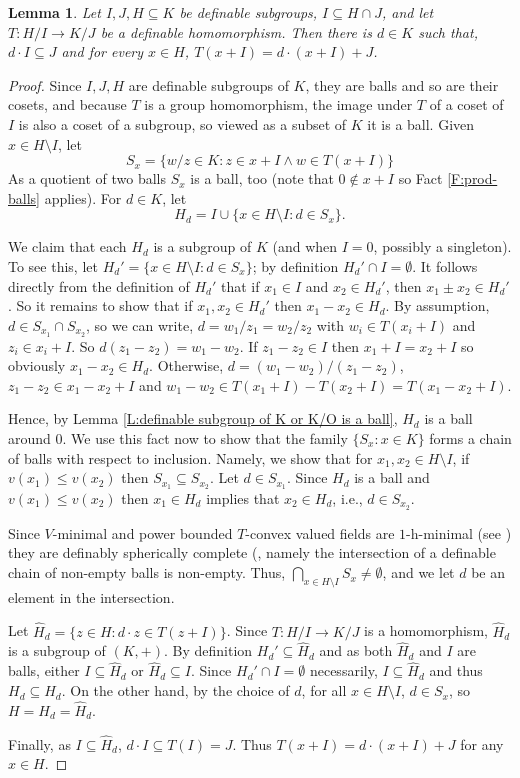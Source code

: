 \documentclass[11pt]{amsart}
\newtheorem{lemma}[theorem]{Lemma}
\theoremstyle{definition}
\newcommand{\0}{\emptyset}
\def\sub{\subseteq}
\begin{document}
\begin{lemma}\label{a general lemma}
Let $I,J, H\subseteq K$ be definable subgroups, $I\subseteq H\cap  J$, and let $T:H/I\to K/J$ be a definable homomorphism.
Then there is $d\in K$ such that, $d\cdot I\subseteq J$ and for every $x\in H$,  $T(x+I)=d\cdot (x+I)+J$.
\end{lemma}
\begin{proof}
Since $I,J, H$ are definable subgroups of $K$, they are balls and so are their cosets, and because $T$ is a group homomorphism, the image under $T$ of a coset of $I$ is also a coset of a subgroup, so viewed as a subset of $K$ it is a ball. 
Given $x\in H\setminus I$, let
\[S_x=\{w/z\in K:z\in x+I \wedge w\in T(x+I)\}\] 
As a quotient of two balls  $S_x$ is a ball, too (note that $0\notin x+I$ so  Fact \ref{F:prod-balls} applies).  For $d\in K$, let
\[H_d=I\cup \{x\in H\setminus I :d\in S_x\}.\]

We claim that each $H_d$ is a subgroup of $K$ (and when $I=0$, possibly a singleton). To see this, let $H_d'=\{x\in H\setminus I :d\in S_x\}$; by definition $H_d'\cap I=\emptyset$. It follows directly from the definition of $H_d'$ that if $x_1\in I$ and $x_2\in H_d'$, then $x_1\pm x_2\in H_d'$. So it remains to show that if $x_1,x_2\in H_d'$ then   $x_1-x_2\in H_d$. By assumption, $d\in S_{x_1}\cap S_{x_2}$, so  we can write,  $d=w_1/z_1=w_2/z_2$ with $w_i\in T(x_i+I)$ and $z_i\in x_i+I$. So $d(z_1-z_2)=w_1-w_2$. If $z_1-z_2\in I$ then $x_1+I=x_2+I$ so obviously $x_1-x_2\in H_d$. Otherwise, $d=(w_1-w_2)/(z_1-z_2)$,  $z_1-z_2\in x_1-x_2+I$ and $w_1-w_2\in T(x_1+I)-T(x_2+I)=T(x_1-x_2+I)$.

Hence, by Lemma \ref{L:definable subgroup of K or K/O is a ball}, $H_d$ is a ball around $0$. We use this fact now to show that the family $\{S_x:x\in K\}$ forms a chain of balls with respect to inclusion. Namely, we show that for $x_1,x_2\in H\setminus I$, if $v(x_1)\leq v(x_2)$ then $S_{x_1}\sub S_{x_2}$.  Let $d\in S_{x_1}$. Since $H_d$ is a ball and $v(x_1)\leq v(x_2)$ then $x_1\in H_d$ implies that  $x_2\in H_d$, i.e., $d\in S_{x_2}$.

Since $V$-minimal and power bounded $T$-convex valued fields are $1$-h-minimal (see \cite[Section 6]{hensel-min}) they are  definably spherically complete (\cite[Lemma 2.7.1]{hensel-min}, namely the intersection of a definable chain of non-empty balls is non-empty. 
Thus, $\bigcap\limits_{x\in H\setminus I} S_x\neq \0$,  and we let $d$ be an element in the intersection.


Let $\hat H_d=\{ z\in H: d\cdot z\in T(z+I)\}$. Since $T: H/I \to K/J$ is a homomorphism, $\hat H_d$  is a subgroup of $(K,+)$. By definition $H_d'\subseteq \hat H_d$ and as both $\hat H_d$ and $I$ are balls, either $I\subseteq \hat H_d$ or $\hat H_d\subseteq I$. Since $H_d'\cap I=\emptyset$ necessarily, $I\subseteq \hat H_d$ and thus $H_d\subseteq \hat H_d$. On the other hand, by the choice of $d$, for all $x\in H\setminus I$, $d\in S_x$,  so $H=H_d=\hat H_d$.

Finally, as $I\subseteq \hat H_d$, $d\cdot I\subseteq T(I)=J$. Thus $T(x+I)=d\cdot (x+I)+J$ for any $x\in H$.
\end{proof}
\end{document}
